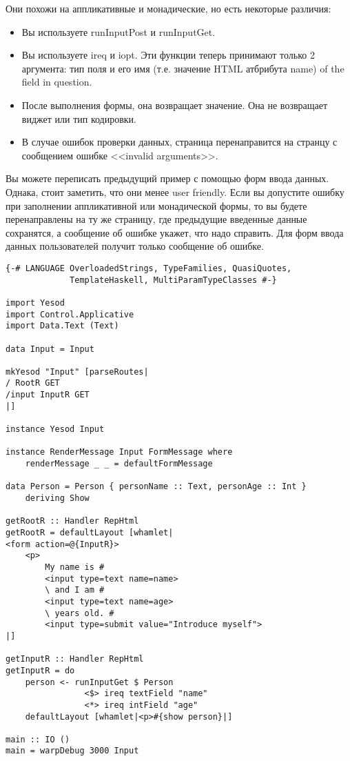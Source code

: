 Они похожи на аппликативные и монадические, но есть некоторые различия:
\begin{itemize}
 \item Вы используете runInputPost и runInputGet.
 \item Вы используете ireq и iopt. Эти функции теперь принимают только 2 аргумента:
 тип поля и его имя (т.е. значение HTML атбрибута name) of the field in question.
 \item После выполнения формы, она возвращает значение. 
 Она не возвращает виджет или тип кодировки.
 \item В случае ошибок проверки данных, страница перенаправится на странцу 
 с сообщением ошибке <<invalid arguments>>.
\end{itemize}
Вы можете переписать предыдущий пример с помощью форм ввода данных. Однака, стоит 
заметить, что они менее user friendly. Если вы допустите ошибку при заполнении 
аппликативной или монадической формы, то вы будете перенаправлены на ту же 
страницу, где предыдущие введенные данные сохранятся, а сообщение об ошибке 
укажет, что надо справить. Для форм ввода данных пользователей получит только 
сообщение об ошибке.

\begin{lstlisting}
{-# LANGUAGE OverloadedStrings, TypeFamilies, QuasiQuotes,
             TemplateHaskell, MultiParamTypeClasses #-}

import Yesod
import Control.Applicative
import Data.Text (Text)

data Input = Input

mkYesod "Input" [parseRoutes|
/ RootR GET
/input InputR GET
|]

instance Yesod Input

instance RenderMessage Input FormMessage where
    renderMessage _ _ = defaultFormMessage

data Person = Person { personName :: Text, personAge :: Int }
    deriving Show

getRootR :: Handler RepHtml
getRootR = defaultLayout [whamlet|
<form action=@{InputR}>
    <p>
        My name is #
        <input type=text name=name>
        \ and I am #
        <input type=text name=age>
        \ years old. #
        <input type=submit value="Introduce myself">
|]

getInputR :: Handler RepHtml
getInputR = do
    person <- runInputGet $ Person
                <$> ireq textField "name"
                <*> ireq intField "age"
    defaultLayout [whamlet|<p>#{show person}|]

main :: IO ()
main = warpDebug 3000 Input
\end{lstlisting}

